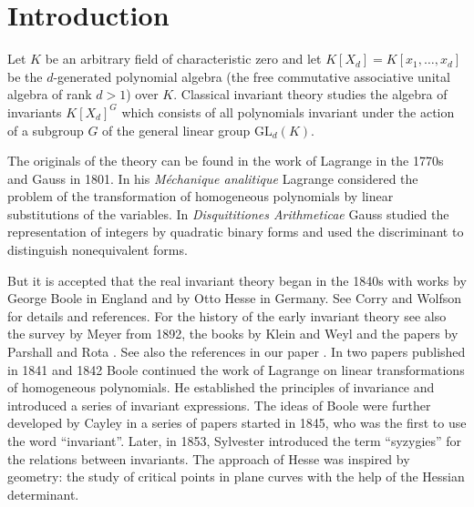 \documentclass{amsart}
\theoremstyle{definition}
\begin{document}
\maketitle

\section{\textbf{Introduction}}
Let $K$ be an arbitrary field of characteristic zero and let $K[X_d] = K[x_1,\ldots,x_d]$  be the $d$-generated polynomial algebra (the free commutative associative unital algebra of rank $d>1$) over $K$.
Classical invariant theory studies the algebra of invariants $K[X_d]^G$ which consists of all polynomials invariant under the action of a subgroup $G$ of the general linear group $\text{GL}_d(K)$.

The originals of the theory can be found in the work of Lagrange in the 1770s and Gauss in 1801.
In his {\it M\'echanique analitique} \cite{La} Lagrange considered the problem of the transformation of homogeneous polynomials by linear substitutions of the variables.
In {\it Disquititiones Arithmeticae} \cite{Ga} Gauss studied the representation of integers by quadratic binary forms and used the discriminant to distinguish nonequivalent forms.

But it is accepted that the real invariant theory began in the 1840s with works by George Boole in England and by Otto Hesse in Germany.
See Corry \cite{Co} and Wolfson \cite{Wol} for details and references.
For the history of the early invariant theory see also the survey by Meyer \cite{Mey} from 1892, the books by Klein \cite{Kl} and Weyl \cite[the beginning of Chapter II]{Wey} and
the papers by Parshall \cite{Par} and Rota \cite{Ro}. See also the references in our paper \cite{BDDK}.
In two papers published in 1841 and 1842 Boole continued the work of Lagrange on linear transformations of homogeneous polynomials.
He established the principles of invariance  and introduced a series of invariant expressions.
The ideas of Boole were further developed by Cayley in a series of papers started in 1845, who was the first to use the word ``invariant''.
Later, in 1853, Sylvester introduced the term ``syzygies'' for the relations between invariants.
The approach of Hesse was inspired by geometry: the study of critical points in plane curves with the help of the Hessian determinant.
\end{document}
